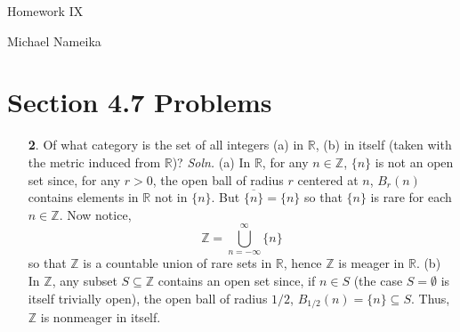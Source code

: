 \documentclass{article}
\begin{document}
\begin{center}
    {\Huge Homework IX}
    \vspace{0.5cm}

    {\Large Michael Nameika}
\end{center}
\section*{Section 4.7 Problems}
\begin{itemize}
    \item[\textbf{2}.] Of what category is the set of all integers (a) in $\mathbb{R}$, (b) in itself (taken with the metric induced from $\mathbb{R}$)?
    \newline\newline
    \textit{Soln.} (a) In $\mathbb{R}$, for any $n \in \mathbb{Z}$, $\{n\}$ is not an open set since, for any $r > 0$, the open ball of radius $r$ centered at $n$, $B_r(n)$ contains elements in $\mathbb{R}$ not in $\{n\}$. But $\overline{\{n\}} = \{n\}$ so that $\{n\}$ is rare for each $n \in \mathbb{Z}$. Now notice,
    \[\mathbb{Z} = \bigcup_{n = -\infty}^{\infty}\{n\}\]
    so that $\mathbb{Z}$ is a countable union of rare sets in $\mathbb{R}$, hence $\mathbb{Z}$ is meager in $\mathbb{R}$.
    \newline\newline
    (b) In $\mathbb{Z}$, any subset $S \subseteq \mathbb{Z}$ contains an open set since, if $n \in S$ (the case $S = \emptyset$ is itself trivially open), the open ball of radius $1/2$, $B_{1/2}(n) = \{n\} \subseteq S$. Thus, $\mathbb{Z}$ is nonmeager in itself.




\end{itemize}
\end{document}
